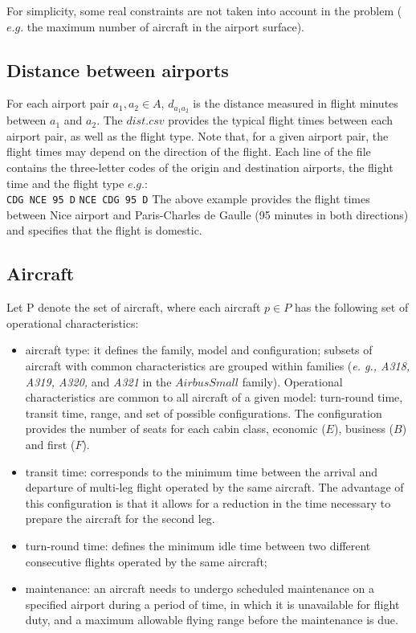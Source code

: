 \documentclass[ijoo,nonblindrev]{informs-ijoo}
\begin{document}
For simplicity, some real constraints are not taken into account in the problem ($e. g.$ the maximum number of aircraft in the airport surface).

\subsection{Distance between airports} \label{subsec:distance}

For each airport pair $a_1, a_2  \in  A $, $d_{a_1 a_2}$ is the distance measured in flight minutes between $a_1$ and $a_2$.
The $dist.csv$ provides the typical flight times between each airport pair, as well as the flight type. Note that, for a given airport pair, the flight times may depend on the direction of the flight. Each line of the file contains the three-letter codes of the origin and destination airports, the flight time and the flight type $e.g.$: \\
\newline
{\texttt{\footnotesize CDG NCE 95 D}}
\newline
{\texttt{\footnotesize NCE CDG 95 D}}
\newline
\newline
The above example provides the flight times between Nice airport and Paris-Charles de Gaulle (95 minutes in both directions) and specifies that the flight is domestic.

\subsection{Aircraft} \label{subsec:aicraft}

Let P denote the set of aircraft, where each aircraft $p \in  P$ has the following set of operational characteristics:\\
\begin{itemize}
	\item aircraft type: it defines the family, model and configuration; subsets of aircraft with common characteristics are grouped within families (\textit{e. g., A318, A319, A320,} and \textit{A321} in the \textit{$Airbus Small$} family). Operational characteristics are common to all aircraft of a given model: turn-round time, transit time, range, and set of possible configurations. The configuration provides the number of seats for each cabin class, economic ($E$), business ($B$) and first ($F$).
	
	\item transit time: corresponds to the minimum time between the arrival and departure of multi-leg flight operated by the same aircraft. The advantage of this configuration is that it allows for a reduction in the time necessary to prepare the aircraft for the second leg.
	
	\item turn-round time: defines the minimum idle time between two different consecutive flights operated by the same aircraft;
	\item maintenance: an aircraft needs to undergo scheduled maintenance on a specified airport during a period of time, in which it is unavailable for flight duty, and a maximum allowable flying range before the maintenance is due. 
\end{itemize}
\end{document}
